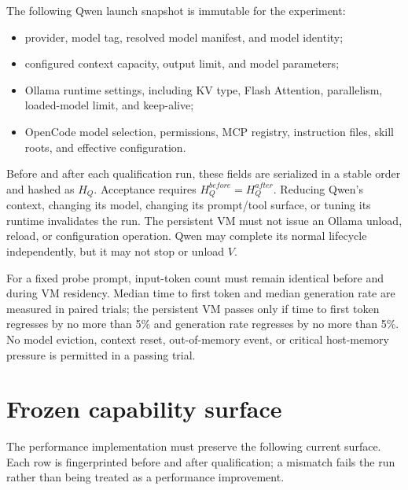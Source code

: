 \documentclass[10pt]{article}
\begin{document}
The following Qwen launch snapshot is immutable for the experiment:

\begin{itemize}
  \item provider, model tag, resolved model manifest, and model identity;
  \item configured context capacity, output limit, and model parameters;
  \item Ollama runtime settings, including KV type, Flash Attention,
        parallelism, loaded-model limit, and keep-alive;
  \item OpenCode model selection, permissions, MCP registry, instruction files,
        skill roots, and effective configuration.
\end{itemize}

Before and after each qualification run, these fields are serialized in a
stable order and hashed as \(H_Q\).  Acceptance requires
\(H_Q^{before}=H_Q^{after}\).  Reducing Qwen's context, changing its model,
changing its prompt/tool surface, or tuning its runtime invalidates the run.
The persistent VM must not issue an Ollama unload, reload, or configuration
operation.  Qwen may complete its normal lifecycle independently, but it may not
stop or unload \(V\).

For a fixed probe prompt, input-token count must remain identical before and
during VM residency.  Median time to first token and median generation rate are
measured in paired trials; the persistent VM passes only if time to first token
regresses by no more than 5\% and generation rate regresses by no more than 5\%.
No model eviction, context reset, out-of-memory event, or critical host-memory
pressure is permitted in a passing trial.

\section{Frozen capability surface}

The performance implementation must preserve the following current surface.
Each row is fingerprinted before and after qualification; a mismatch fails the
run rather than being treated as a performance improvement.
\end{document}
